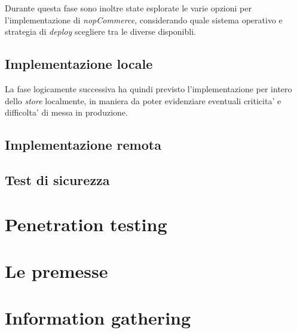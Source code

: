 \documentclass[a4paper]{report}
\begin{document}
		Durante questa fase sono inoltre state esplorate le varie opzioni per l'implementazione di \emph{nopCommerce},
		considerando quale sistema operativo e strategia di \emph{deploy} scegliere tra le diverse disponibli.
	\section{Implementazione locale}
		La fase logicamente successiva ha quindi previsto l'implementazione per intero dello \emph{store} localmente,
		in maniera da poter evidenziare eventuali criticita' e difficolta' di messa in produzione.
	\section{Implementazione remota}%
	\section{Test di sicurezza}

\chapter{Penetration testing}
	\chapter{Le premesse}
	\chapter{Information gathering}
\end{document}
